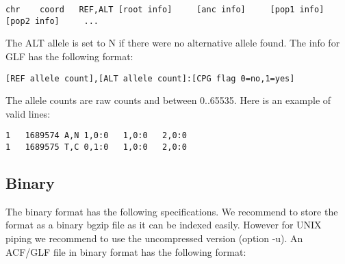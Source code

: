 \documentclass[a4paper]{article}
\begin{document}
\begin{verbatim}
chr    coord   REF,ALT [root info]     [anc info]     [pop1 info]     [pop2 info]     ...
\end{verbatim}

\noindent  The ALT allele is set to N if there were no alternative allele found. The info for GLF has the following format:

\begin{verbatim}
[REF allele count],[ALT allele count]:[CPG flag 0=no,1=yes]
\end{verbatim}

\noindent  The allele counts are raw counts and between 0..65535. Here is an example of valid lines:

\begin{verbatim}
1	1689574	A,N	1,0:0	1,0:0	2,0:0
1	1689575	T,C	0,1:0	1,0:0	2,0:0
\end{verbatim}



\subsection{Binary}


\noindent The binary format has the following specifications. We recommend to store the format as a binary bgzip file as it can be indexed easily. However for UNIX piping we recommend to use the uncompressed version (option -u). An ACF/GLF file in binary format has the following format:

\end{document}
